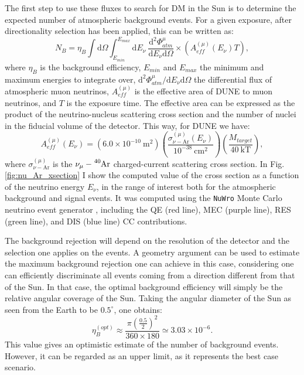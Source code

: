 The first step to use these fluxes to search for DM in the Sun is to determine the expected number of atmospheric background events. For a given exposure, after directionality selection has been applied, this can be written as:
\begin{equation}\label{4.1}
	N_{B} = \eta_{B} \int \mathrm{d}\Omega \int_{E_{min}}^{E_{max}} \mathrm{d}E_{\nu} \ \frac{\mathrm{d}^{2}\Phi_{atm}^{\mu}}{\mathrm{d}E_{\nu} \mathrm{d}\Omega} \times \left(A_{eff}^{(\mu)}(E_{\nu}) T\right),
\end{equation}
where $\eta_{B}$ is the background efficiency, $E_{min}$ and $E_{max}$ the minimum and maximum energies to integrate over, $\mathrm{d}^{2}\Phi_{atm}^{\mu} / \mathrm{d}E_{\nu} \mathrm{d}\Omega$ the differential flux of atmospheric muon neutrinos, $A_{eff}^{(\mu)}$ is the effective area of DUNE to muon neutrinos, and $T$ is the exposure time. The effective area can be expressed as the product of the neutrino-nucleus scattering cross section and the number of nuclei in the fiducial volume of the detector. This way, for DUNE we have:
\begin{equation}\label{4.2}
	A_{eff}^{(\mu)}(E_{\nu}) = (6.0 \times 10^{-10} \ \mathrm{m}^{2}) \left(\frac{\sigma_{\nu - \mathrm{Ar}}^{(\mu)}(E_{\nu})}{10^{-38} \ \mathrm{cm}^{2}}\right) \left(\frac{M_{target}}{40 \ \mathrm{kT}}\right),
\end{equation}
where $\sigma_{\nu - \mathrm{Ar}}^{(\mu)}$ is the $\nu_{\mu}-\ce{^{40}Ar}$ charged-current scattering cross section. In Fig. \ref{fig:nu_Ar_xsection} I show the computed value of the cross section as a function of the neutrino energy $E_{\nu}$, in the range of interest both for the atmospheric background and signal events. It was computed using the \texttt{NuWro} Monte Carlo neutrino event generator \cite{Golan2012}, including the QE (red line), MEC (purple line), RES (green line), and DIS (blue line) CC contributions.

The background rejection will depend on the resolution of the detector and the selection one applies on the events. A geometry argument can be used to estimate the maximum background rejection one can achieve in this case, considering one can efficiently discriminate all events coming from a direction different from that of the Sun. In that case, the optimal background efficiency will simply be the relative angular coverage of the Sun. Taking the angular diameter of the Sun as seen from the Earth to be $0.5^{\circ}$, one obtains:
\begin{equation}\label{4.3}
	\eta_{B}^{(opt)} \approx \frac{\pi \left(\frac{0.5}{2}\right)^{2}}{360 \times 180} \simeq 3.03 \times 10^{-6}.
\end{equation}
This value gives an optimistic estimate of the number of background events. However, it can be regarded as an upper limit, as it represents the best case scenario.

